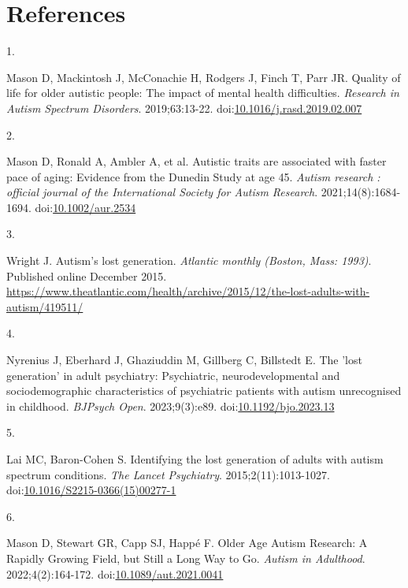 \documentclass[
  letterpaper,
  DIV=11,
  numbers=noendperiod]{scrreprt}
\newlength{\cslhangindent}
\newlength{\csllabelwidth}
\newenvironment{CSLReferences}[2] %
 {\begin{list}{}{%
  \setlength{\itemindent}{0pt}
  \setlength{\leftmargin}{0pt}
  \setlength{\parsep}{0pt}
  \ifodd #1
   \setlength{\leftmargin}{\cslhangindent}
   \setlength{\itemindent}{-1\cslhangindent}
  \fi
  \setlength{\itemsep}{#2\baselineskip}}}
 {\end{list}}
\newcommand{\CSLLeftMargin}[1]{\parbox[t]{\csllabelwidth}{\strut#1\strut}}
\newcommand{\CSLRightInline}[1]{\parbox[t]{\linewidth - \csllabelwidth}{\strut#1\strut}}
\begin{document}

\chapter{References}\label{sec-references}

\label{refs}
\begin{CSLReferences}{0}{1}
\CSLLeftMargin{1. }%
\CSLRightInline{Mason D, Mackintosh J, McConachie H, Rodgers J, Finch T,
Parr JR. Quality of life for older autistic people: {The} impact of
mental health difficulties. \emph{Research in Autism Spectrum
Disorders}. 2019;63:13-22.
doi:\href{https://doi.org/10.1016/j.rasd.2019.02.007}{10.1016/j.rasd.2019.02.007}}

\CSLLeftMargin{2. }%
\CSLRightInline{Mason D, Ronald A, Ambler A, et al. Autistic traits are
associated with faster pace of aging: {Evidence} from the {Dunedin
Study} at age 45. \emph{Autism research : official journal of the
International Society for Autism Research}. 2021;14(8):1684-1694.
doi:\href{https://doi.org/10.1002/aur.2534}{10.1002/aur.2534}}

\CSLLeftMargin{3. }%
\CSLRightInline{Wright J. Autism's lost generation. \emph{Atlantic
monthly (Boston, Mass: 1993)}. Published online December 2015.
\url{https://www.theatlantic.com/health/archive/2015/12/the-lost-adults-with-autism/419511/}}

\CSLLeftMargin{4. }%
\CSLRightInline{Nyrenius J, Eberhard J, Ghaziuddin M, Gillberg C,
Billstedt E. The 'lost generation' in adult psychiatry: Psychiatric,
neurodevelopmental and sociodemographic characteristics of psychiatric
patients with autism unrecognised in childhood. \emph{BJPsych Open}.
2023;9(3):e89.
doi:\href{https://doi.org/10.1192/bjo.2023.13}{10.1192/bjo.2023.13}}

\CSLLeftMargin{5. }%
\CSLRightInline{Lai MC, Baron-Cohen S. Identifying the lost generation
of adults with autism spectrum conditions. \emph{The Lancet Psychiatry}.
2015;2(11):1013-1027.
doi:\href{https://doi.org/10.1016/S2215-0366(15)00277-1}{10.1016/S2215-0366(15)00277-1}}

\CSLLeftMargin{6. }%
\CSLRightInline{Mason D, Stewart GR, Capp SJ, Happé F. Older {Age Autism
Research}: {A Rapidly Growing Field}, but {Still} a {Long Way} to {Go}.
\emph{Autism in Adulthood}. 2022;4(2):164-172.
doi:\href{https://doi.org/10.1089/aut.2021.0041}{10.1089/aut.2021.0041}}


\end{CSLReferences}
\end{document}
